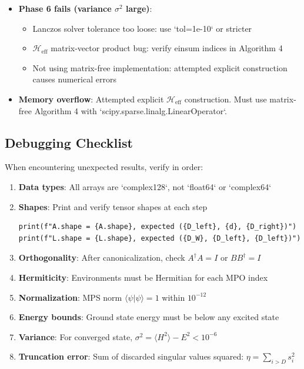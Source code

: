 \documentclass[aps,prb,onecolumn,scriptaddress]{revtex4-2}
\newcommand{\braket}[2]{\langle#1|#2\rangle}
\begin{document}
\begin{itemize}
\begin{itemize}
\item Missing noise injection: add $\rho \to \rho + \alpha \mathbb{I}$ with $\alpha \sim 10^{-5}$
\item Initial state too far from ground state: use random MPS with small $D$ first
\end{itemize}
\item \textbf{Phase 6 fails (variance $\sigma^2$ large)}: 
\begin{itemize}
\item Lanczos solver tolerance too loose: use `tol=1e-10` or stricter
\item $\mathcal{H}_{\text{eff}}$ matrix-vector product bug: verify einsum indices in Algorithm 4
\item Not using matrix-free implementation: attempted explicit construction causes numerical errors
\end{itemize}
\item \textbf{Memory overflow}: Attempted explicit $\mathcal{H}_{\text{eff}}$ construction. Must use matrix-free Algorithm 4 with `scipy.sparse.linalg.LinearOperator`.
\end{itemize}

\subsection{Debugging Checklist}

When encountering unexpected results, verify in order:

\begin{enumerate}
\item \textbf{Data types}: All arrays are `complex128`, not `float64` or `complex64`
\item \textbf{Shapes}: Print and verify tensor shapes at each step
\begin{verbatim}
print(f"A.shape = {A.shape}, expected ({D_left}, {d}, {D_right})")
print(f"L.shape = {L.shape}, expected ({D_W}, {D_left}, {D_left})")
\end{verbatim}
\item \textbf{Orthogonality}: After canonicalization, check $A^\dagger A = I$ or $BB^\dagger = I$
\item \textbf{Hermiticity}: Environments must be Hermitian for each MPO index
\item \textbf{Normalization}: MPS norm $\braket{\psi}{\psi} = 1$ within $10^{-12}$
\item \textbf{Energy bounds}: Ground state energy must be below any excited state
\item \textbf{Variance}: For converged state, $\sigma^2 = \langle H^2 \rangle - E^2 < 10^{-6}$
\item \textbf{Truncation error}: Sum of discarded singular values squared: $\eta = \sum_{i>D} s_i^2$
\end{enumerate}
\end{document}
